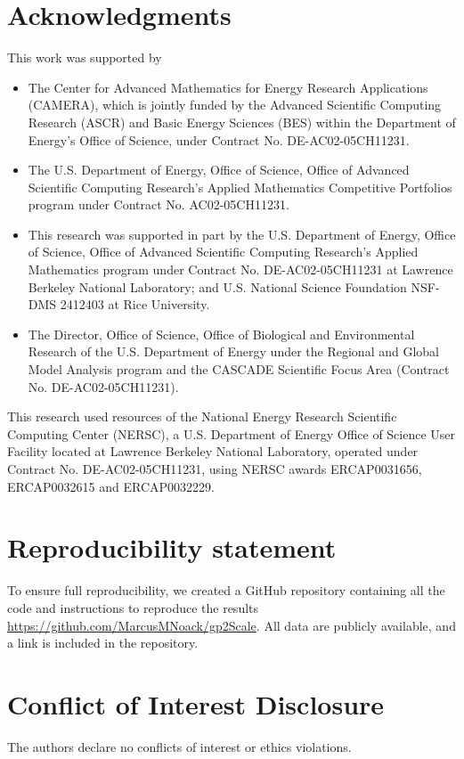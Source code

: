 \documentclass{article}
\begin{document}
\section*{Acknowledgments}
This work was supported by
\begin{itemize}
    \item The Center for Advanced Mathematics for Energy Research Applications (CAMERA), which is jointly funded by the Advanced Scientific Computing Research (ASCR) and Basic Energy Sciences (BES) within the Department of Energy’s Office of Science, under Contract No. DE-AC02-05CH11231.
    \item The U.S. Department of Energy, Office of Science, Office of Advanced Scientific Computing Research's Applied Mathematics Competitive Portfolios program under Contract No. AC02-05CH11231.
    \item This research was supported in part by the U.S. Department of Energy, Office of Science, Office of Advanced Scientific Computing Research's Applied Mathematics program under Contract No. DE-AC02-05CH11231 at Lawrence Berkeley National Laboratory; and U.S. National Science Foundation NSF-DMS 2412403 at Rice University.
    \item The Director, Office of Science, Office of Biological and Environmental Research of the U.S. Department of Energy under the Regional and Global Model Analysis program and the CASCADE Scientific Focus Area (Contract No. DE-AC02-05CH11231). 
\end{itemize}

This research used resources of the National Energy Research Scientific Computing Center (NERSC), a U.S. Department of Energy Office of Science User Facility located at Lawrence Berkeley National Laboratory, operated under Contract No. DE-AC02-05CH11231, using NERSC awards ERCAP0031656,  ERCAP0032615 and ERCAP0032229.


\section*{Reproducibility statement}
To ensure full reproducibility, we created a GitHub repository containing all the code and instructions to reproduce the results \url{https://github.com/MarcusMNoack/gp2Scale}. All data are publicly available, and a link is included in the repository. 

\section*{Conflict of Interest Disclosure}
The authors declare no conflicts of interest or ethics violations. 
\end{document}
